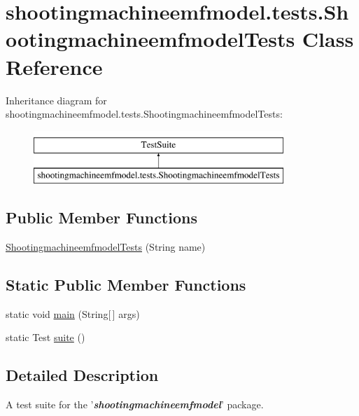 \hypertarget{classshootingmachineemfmodel_1_1tests_1_1_shootingmachineemfmodel_tests}{\section{shootingmachineemfmodel.\-tests.\-Shootingmachineemfmodel\-Tests Class Reference}
\label{classshootingmachineemfmodel_1_1tests_1_1_shootingmachineemfmodel_tests}
}
Inheritance diagram for shootingmachineemfmodel.\-tests.\-Shootingmachineemfmodel\-Tests\-:\begin{figure}[H]
\begin{center}
\leavevmode
\includegraphics[height=2.000000cm]{classshootingmachineemfmodel_1_1tests_1_1_shootingmachineemfmodel_tests}
\end{center}
\end{figure}
\subsection*{Public Member Functions}
\begin{DoxyCompactItemize}
\item 
\hyperlink{classshootingmachineemfmodel_1_1tests_1_1_shootingmachineemfmodel_tests_aba71be3cc70f0696ed6af4948cac0e7c}{Shootingmachineemfmodel\-Tests} (String name)
\end{DoxyCompactItemize}
\subsection*{Static Public Member Functions}
\begin{DoxyCompactItemize}
\item 
static void \hyperlink{classshootingmachineemfmodel_1_1tests_1_1_shootingmachineemfmodel_tests_a2af8d01a69e82a8da0976412c9870d69}{main} (String\mbox{[}$\,$\mbox{]} args)
\item 
static Test \hyperlink{classshootingmachineemfmodel_1_1tests_1_1_shootingmachineemfmodel_tests_a3af088018d9c4aa71e922511c491053f}{suite} ()
\end{DoxyCompactItemize}


\subsection{Detailed Description}
A test suite for the '{\itshape {\bfseries shootingmachineemfmodel}}' package.

